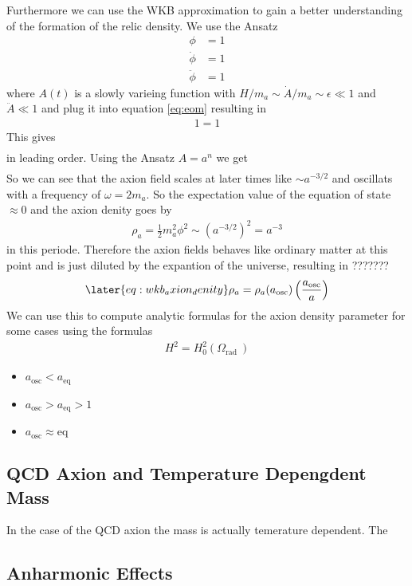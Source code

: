 \documentclass[a4paper]{article}
\begin{document}
Furthermore we can use the WKB approximation to gain a better understanding of the formation of the relic density.
We use the Ansatz
\begin{align*}
    \phi &= 1 \\
    \dot{\phi} &= 1 \\
    \ddot{\phi} &= 1
\end{align*}
where $A(t)$ is a slowly varieing function with $H / m_a \sim \dot{A} / m_a \sim \epsilon \ll 1$ and $\ddot{A} \ll 1$
and plug it into equation \ref{eq:eom}
resulting in
\begin{align*}
    1 = 1
\end{align*}
This gives
\begin{align*}
\end{align*}
in leading order.
Using the Ansatz $A = a^n$ we get
\begin{align*}
\end{align*}
So we can see that the axion field scales at later times like $\sim a^{-3/2}$
and oscillats with a frequency of $\omega = 2m_a$. So
the expectation value of the equation of state $\approx 0$ and the axion denity goes by
\begin{align*}
    \rho_a = \frac{1}{2}m_a^2\phi^2 \sim \left(a^{-3/2}\right)^2 = a^{-3}
\end{align*}
in this periode. Therefore the axion fields behaves like ordinary matter at this point and
is just diluted by the expantion of the universe, resulting in ???????
\begin{align}
    \later{eq:wkb_axion_denity}
    \rho_a = \rho_a(a_\mathrm{osc}) \left( \frac{a_\mathrm{osc}}{a} \right)
\end{align}
We can use this to compute analytic formulas for the axion density parameter for some cases using the formulas
\begin{align*}
    H^2 = H_0^2 \left( \Omega_\mathrm{rad} \    \right)
\end{align*}
\begin{itemize}
    \item $a_\mathrm{osc} < a_\mathrm{eq}$ \\
    \item $a_\mathrm{osc} > a_\mathrm{eq} > 1$ \\
    \item $a_\mathrm{osc} \approx \mathrm{eq}$ \\
\end{itemize}




\subsection{QCD Axion and Temperature Depengdent Mass}
\label{sec:temerature_dependent_mass}
In the case of the QCD axion the mass is actually temerature dependent.
The

\subsection{Anharmonic Effects}
\label{sec:anharmonic_effects}
{}

\end{document}
